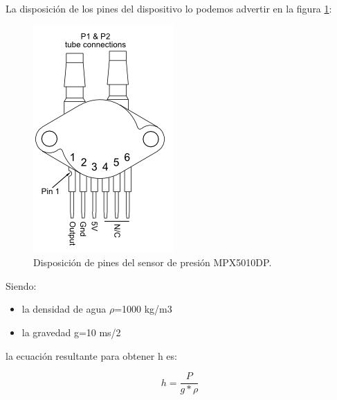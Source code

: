 La disposición de los pines del dispositivo lo podemos advertir en la figura \ref{fig:disposición de pines del sensor}:
\begin{figure}[h]
\centering
\includegraphics[scale=.65]{./Figures/DisposicionDePinesSensor.png}
\caption{Disposición de pines del sensor de presión MPX5010DP.}
\label{fig:disposición de pines del sensor}
\end{figure}
\vspace{1cm}
Siendo: 
\begin{itemize}
\item la densidad de agua $\rho$=1000 kg/m3  
\item la gravedad g=10 ms/2
\end{itemize}
la ecuación resultante para obtener h es: 

\begin{equation}
 \label{eq:presión}
	 h = \frac{P}{g*\rho}	
\end{equation}


